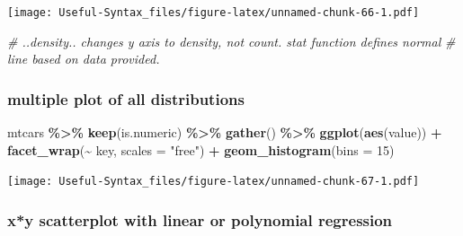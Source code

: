\documentclass[
]{article}
\newenvironment{Shaded}{\begin{snugshade}}{\end{snugshade}}
\newcommand{\AttributeTok}[1]{\textcolor[rgb]{0.13,0.29,0.53}{#1}}
\newcommand{\CommentTok}[1]{\textcolor[rgb]{0.56,0.35,0.01}{\textit{#1}}}
\newcommand{\DecValTok}[1]{\textcolor[rgb]{0.00,0.00,0.81}{#1}}
\newcommand{\FunctionTok}[1]{\textcolor[rgb]{0.13,0.29,0.53}{\textbf{#1}}}
\newcommand{\NormalTok}[1]{#1}
\newcommand{\SpecialCharTok}[1]{\textcolor[rgb]{0.81,0.36,0.00}{\textbf{#1}}}
\newcommand{\StringTok}[1]{\textcolor[rgb]{0.31,0.60,0.02}{#1}}
\begin{document}
\texttt{[image: Useful-Syntax\_files/figure-latex/unnamed-chunk-66-1.pdf]}

\begin{Shaded}
\begin{Highlighting}[]
\CommentTok{\# ..density.. changes y axis to density, not count. stat function defines normal}
\CommentTok{\# line based on data provided.}
\end{Highlighting}
\end{Shaded}

\hypertarget{multiple-plot-of-all-distributions}{%
\subsubsection{multiple plot of all distributions}\label{multiple-plot-of-all-distributions}}

\begin{Shaded}
\begin{Highlighting}[]
\NormalTok{mtcars }\SpecialCharTok{\%\textgreater{}\%} \FunctionTok{keep}\NormalTok{(is.numeric) }\SpecialCharTok{\%\textgreater{}\%} \FunctionTok{gather}\NormalTok{() }\SpecialCharTok{\%\textgreater{}\%} \FunctionTok{ggplot}\NormalTok{(}\FunctionTok{aes}\NormalTok{(value)) }\SpecialCharTok{+}
  \FunctionTok{facet\_wrap}\NormalTok{(}\SpecialCharTok{\textasciitilde{}}\NormalTok{ key, }\AttributeTok{scales =} \StringTok{"free"}\NormalTok{) }\SpecialCharTok{+} \FunctionTok{geom\_histogram}\NormalTok{(}\AttributeTok{bins =} \DecValTok{15}\NormalTok{)}
\end{Highlighting}
\end{Shaded}

\texttt{[image: Useful-Syntax\_files/figure-latex/unnamed-chunk-67-1.pdf]}

\hypertarget{xy-scatterplot-with-linear-or-polynomial-regression}{%
\subsubsection{x*y scatterplot with linear or polynomial regression}\label{xy-scatterplot-with-linear-or-polynomial-regression}}
\end{document}
